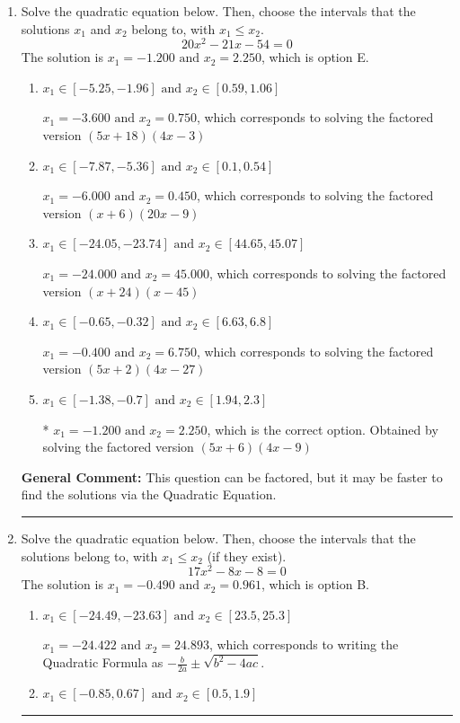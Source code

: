 \documentclass{extbook}[14pt]
\newcommand{\litem}[1]{\item #1

\rule{\textwidth}{0.4pt}}
\begin{document}
\begin{enumerate}\litem{
Solve the quadratic equation below. Then, choose the intervals that the solutions $x_1$ and $x_2$ belong to, with $x_1 \leq x_2$.
\[ 20x^{2} -21 x -54 = 0 \]The solution is \( x_1 = -1.200 \text{ and } x_2 = 2.250 \), which is option E.\begin{enumerate}[label=\Alph*.]
\item \( x_1 \in [-5.25, -1.96] \text{ and } x_2 \in [0.59, 1.06] \)

$x_1 = -3.600 \text{ and } x_2 = 0.750$, which corresponds to solving the factored version $(5x + 18)(4x -3)$
\item \( x_1 \in [-7.87, -5.36] \text{ and } x_2 \in [0.1, 0.54] \)

$x_1 = -6.000 \text{ and } x_2 = 0.450$, which corresponds to solving the factored version $(x + 6)(20x -9)$
\item \( x_1 \in [-24.05, -23.74] \text{ and } x_2 \in [44.65, 45.07] \)

$x_1 = -24.000 \text{ and } x_2 = 45.000$, which corresponds to solving the factored version $(x + 24)(x -45)$
\item \( x_1 \in [-0.65, -0.32] \text{ and } x_2 \in [6.63, 6.8] \)

$x_1 = -0.400 \text{ and } x_2 = 6.750$, which corresponds to solving the factored version $(5x + 2)(4x -27)$
\item \( x_1 \in [-1.38, -0.7] \text{ and } x_2 \in [1.94, 2.3] \)

* $x_1 = -1.200 \text{ and } x_2 = 2.250$, which is the correct option. Obtained by solving the factored version $(5x + 6)(4x -9)$
\end{enumerate}

\textbf{General Comment:} This question can be factored, but it may be faster to find the solutions via the Quadratic Equation.
}
\litem{
Solve the quadratic equation below. Then, choose the intervals that the solutions belong to, with $x_1 \leq x_2$ (if they exist).
\[ 17x^{2} -8 x -8 = 0 \]The solution is \( x_1 = -0.490 \text{ and } x_2 = 0.961 \), which is option B.\begin{enumerate}[label=\Alph*.]
\item \( x_1 \in [-24.49, -23.63] \text{ and } x_2 \in [23.5, 25.3] \)

 $x_1 = -24.422 \text{ and } x_2 = 24.893$, which corresponds to writing the Quadratic Formula as $-\frac{b}{2a} \pm \sqrt{b^2 - 4ac}$.
\item \( x_1 \in [-0.85, 0.67] \text{ and } x_2 \in [0.5, 1.9] \)


\end{enumerate}}
\end{enumerate}
\end{document}
